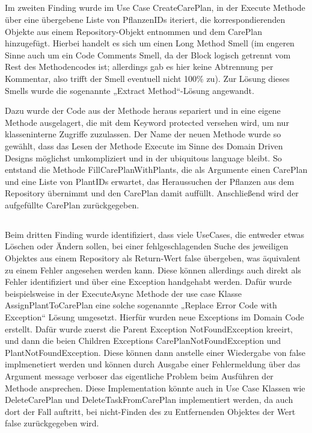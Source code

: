 \subsection*{}
Im zweiten Finding wurde im Use Case CreateCarePlan, in der Execute Methode über eine übergebene Liste von PflanzenIDs iteriert, die korrespondierenden Objekte aus einem Repository-Objekt entnommen und dem CarePlan hinzugefügt. Hierbei handelt es sich um einen Long Method Smell (im engeren Sinne auch um ein Code Comments Smell, da der Block logisch getrennt vom Rest des Methodencodes ist; allerdings gab es hier keine Abtrennung per Kommentar, also trifft der Smell eventuell nicht 100\% zu). Zur Lösung dieses Smells wurde die sogenannte „Extract Method“-Lösung angewandt. 
\par
Dazu wurde der Code aus der Methode heraus separiert und in eine eigene Methode ausgelagert, die mit dem Keyword protected versehen wird, um nur klasseninterne Zugriffe zuzulassen. Der Name der neuen Methode wurde so gewählt, dass das Lesen der Methode Execute im Sinne des Domain Driven Designs möglichst umkompliziert und in der ubiquitous language bleibt. So entstand die Methode FillCarePlanWithPlants, die als Argumente einen CarePlan und eine Liste von PlantIDs erwartet, das Heraussuchen der Pflanzen aus dem Repository übernimmt und den CarePlan damit auffüllt. Anschließend wird der aufgefüllte CarePlan zurückgegeben. 
\subsection*{}
Beim dritten Finding wurde identifiziert, dass viele UseCases, die entweder etwas Löschen oder Ändern sollen, bei einer fehlgeschlagenden Suche des jeweiligen Objektes aus einem Repository als Return-Wert false übergeben, was äquivalent zu einem Fehler angesehen werden kann.  Diese können allerdings auch direkt als Fehler identifiziert und über eine Exception handgehabt werden. Dafür wurde beispielsweise in der ExecuteAsync Methode der use case Klasse AssignPlantToCarePlan eine solche sogenannte „Replace Error Code with Exception“ Lösung umgesetzt. Hierfür wurden neue Exceptions im Domain Code erstellt. Dafür wurde zuerst die Parent Exception NotFoundException kreeirt, und dann die beien Children Exceptions CarePlanNotFoundException und PlantNotFoundException. Diese können dann anstelle einer Wiedergabe von false implmenetiert werden und können durch Ausgabe einer Fehlermeldung über das Argument message verboser das eigentliche Problem beim Ausführen der Methode ansprechen. Diese Implementation könnte auch in Use Case Klassen wie DeleteCarePlan und DeleteTaskFromCarePlan implementiert werden, da auch dort der Fall auftritt, bei nicht-Finden des zu Entfernenden Objektes der Wert false zurückgegeben wird.
